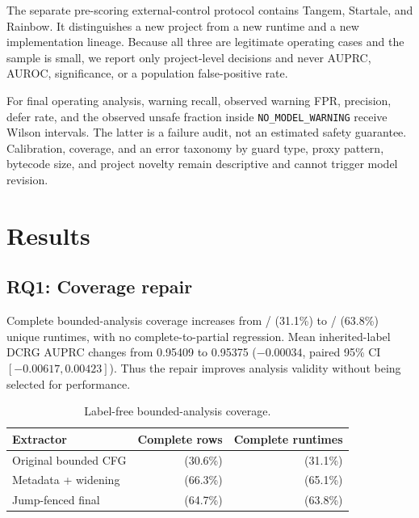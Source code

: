 \documentclass[conference]{IEEEtran}
\newcommand{\code}[1]{\texttt{#1}}
\begin{document}
The separate pre-scoring external-control protocol contains Tangem, Startale, and Rainbow. It
distinguishes a new project from a new runtime and a new implementation lineage. Because all three
are legitimate operating cases and the sample is small, we report only project-level decisions and
never AUPRC, AUROC, significance, or a population false-positive rate.

For final operating analysis, warning recall, observed warning FPR, precision, defer rate, and the
observed unsafe fraction inside \code{NO\_MODEL\_WARNING} receive Wilson intervals. The latter is a
failure audit, not an estimated safety guarantee. Calibration, coverage, and an error taxonomy by
guard type, proxy pattern, bytecode size, and project novelty remain descriptive and cannot trigger
model revision.

\section{Results}

\subsection{RQ1: Coverage repair}

Complete bounded-analysis coverage increases from \BaseCompleteRuntimes{}/\CanonicalRuntimes{}
(31.1\%) to \FinalCompleteRuntimes{}/\CanonicalRuntimes{} (63.8\%) unique
runtimes, with no complete-to-partial regression. Mean inherited-label DCRG AUPRC changes from
0.95409 to 0.95375 ($-0.00034$, paired 95\% CI $[-0.00617,0.00423]$). Thus the repair improves
analysis validity without being selected for performance.

\begin{table}[t]
\centering
\caption{Label-free bounded-analysis coverage.}
\label{tab:coverage}
\small
\begin{tabular}{lrr}
\toprule
Extractor & Complete rows & Complete runtimes \\
\midrule
Original bounded CFG & \BaseCompleteRows{} (30.6\%) & \BaseCompleteRuntimes{} (31.1\%) \\
Metadata + widening & \IntermediateCompleteRows{} (66.3\%) & \IntermediateCompleteRuntimes{} (65.1\%) \\
Jump-fenced final & \FinalCompleteRows{} (64.7\%) & \FinalCompleteRuntimes{} (63.8\%) \\
\bottomrule
\end{tabular}
\end{table}
\end{document}
